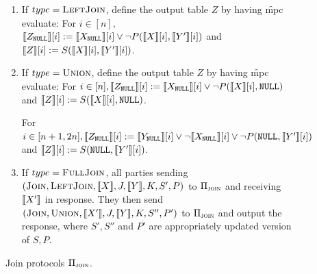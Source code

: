 \begin{figure}
{\begin{minipage}{0.95\linewidth}
\begin{enumerate}
				\item If $type=\textsc{LeftJoin}$, define the output table $Z$ by having \f{mpc} evaluate:
				For $i\in [n],$ $\llbracket Z_\texttt{NULL}\rrbracket[i]:=\llbracket X_\texttt{NULL}\rrbracket[i] \vee \neg P(\llbracket X\rrbracket[i], \llbracket Y'\rrbracket[i])$ and $\llbracket Z\rrbracket[i]:=S(\llbracket X\rrbracket[i], \llbracket Y'\rrbracket[i])$.
				
				
				\item If $type=\textsc{Union}$, define the output table $Z$ by having \f{mpc} evaluate:
				For $i\in [n], \llbracket Z_\texttt{NULL}\rrbracket[i]:= \llbracket X_\texttt{NULL}\rrbracket[i] \vee \neg P(\llbracket X\rrbracket[i], \texttt{NULL})$ and $\llbracket Z\rrbracket[i]:=S(\llbracket X\rrbracket[i], \texttt{NULL})$. 
				
				For $i\in [n+1,2n], \llbracket Z_\texttt{NULL}\rrbracket[i]:= \llbracket Y_\texttt{NULL}\rrbracket[i] \vee \neg \llbracket X_\texttt{NULL}\rrbracket[i] \vee \neg P(\texttt{NULL}, \llbracket Y'\rrbracket[i])$ and $\llbracket Z\rrbracket[i]:=S(\texttt{NULL}, \llbracket Y'\rrbracket[i])$.
				
				\item If  $type=\textsc{FullJoin}$, all parties sending $(\textsc{Join}, \textsc{LeftJoin}, \llbracket X\rrbracket, J, \llbracket Y\rrbracket, K, S', P)$ to $\Pi_{\textsc{join}}$ and receiving $\llbracket X'\rrbracket$ in response. They then send $(\textsc{Join}, \textsc{Union}, \llbracket X'\rrbracket, J, \llbracket Y\rrbracket, K, S'', P')$  to $\Pi_{\textsc{join}}$ and output the response, where $S',S''$ and $P'$ are appropriately updated version of $S,P$.
			\end{enumerate}
	\end{minipage}}
\vspace{-0.3cm}
	\caption{Join protocols $\Pi_{\textsc{join}}$.}
	\label{fig:full_proto}	
	\vspace{-0.3cm}
\end{figure}



